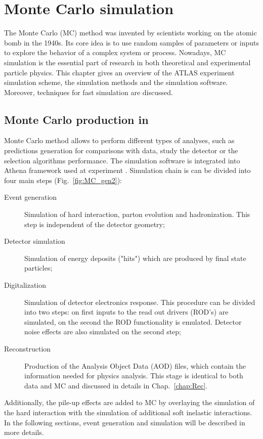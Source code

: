 
\chapter{Monte Carlo simulation}\label{chap:MC}
\minitoc
The Monte Carlo (MC) method was invented by scientists working on the atomic bomb in the 1940s. Its core idea is to use random samples of parameters or inputs to explore the behavior of a complex system or process.  Nowadays, MC simulation is the  essential part of research in both theoretical and experimental particle physics.
This chapter gives an overview of the ATLAS experiment simulation scheme, the simulation methods and the simulation software. Moreover, techniques for fast simulation are discussed. 

\section{Monte Carlo production in \atlas}

\begin{figure}[!b]
\end{figure}

Monte Carlo method allows to perform different types of analyses, such as predictions generation for comparisons with data, study the detector or the selection algorithms performance. The \atlas simulation software is integrated into Athena framework used at \atlas experiment \cite{Athena}. Simulation chain is can be divided into four main steps (Fig.~\ref{fig:MC_gen2}):
\begin{description}
\item[Event generation] Simulation of hard interaction, parton evolution and hadronization. This step is independent of the \atlas detector geometry;
\item[Detector simulation] Simulation of energy deposits ("hits") which are produced by final state particles;
\item[Digitalization] Simulation of detector electronics response. This procedure can be divided into two steps: on first inputs to the read out drivers (ROD's) are simulated, on the second the ROD functionality is emulated. Detector noise effects are also simulated on the second step;
\item[Reconstruction] Production of the Analysis Object Data (AOD) files, which contain the information needed for physics analysis. This stage is identical to both data and MC and discussed in details in Chap.~\ref{chap:Rec}.
\end{description}
Additionally, the pile-up effects are added to MC by overlaying the simulation of the hard interaction with the simulation of additional soft inelastic interactions. In the following sections, event generation and simulation will be described in more details.

